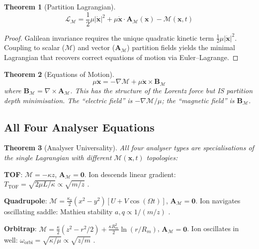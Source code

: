 \documentclass[11pt,twocolumn,a4paper]{article}
\newtheorem{theorem}{Theorem}[section]
\theoremstyle{definition}
\theoremstyle{remark}
\newcommand{\Depth}{\mathcal{M}}
\newcommand{\partinert}{\mu}
\newcommand{\Apartition}{\mathbf{A}_{\mathcal{M}}}
\newcommand{\Lagr}{\mathcal{L}}
\begin{document}
\begin{theorem}[Partition Lagrangian]
\label{thm:lagrangian}
\begin{equation}
\boxed{\Lagr_\Depth = \frac{1}{2}\partinert|\dot{\mathbf{x}}|^2 + \partinert\dot{\mathbf{x}}\cdot\Apartition(\mathbf{x}) - \Depth(\mathbf{x}, t)}
\end{equation}
\end{theorem}

\begin{proof}
Galilean invariance requires the unique quadratic kinetic term $\frac{1}{2}\partinert|\dot{\mathbf{x}}|^2$. Coupling to scalar ($\Depth$) and vector ($\Apartition$) partition fields yields the minimal Lagrangian that recovers correct equations of motion via Euler--Lagrange.
\end{proof}

\begin{theorem}[Equations of Motion]
\begin{equation}
\boxed{\partinert\ddot{\mathbf{x}} = -\nabla\Depth + \partinert\dot{\mathbf{x}} \times \mathbf{B}_\Depth}
\end{equation}
where $\mathbf{B}_\Depth = \nabla \times \Apartition$. This has the \emph{structure} of the Lorentz force but IS partition depth minimisation. The ``electric field'' is $-\nabla\Depth/\partinert$; the ``magnetic field'' is $\mathbf{B}_\Depth$.
\end{theorem}

\subsection{All Four Analyser Equations}

\begin{theorem}[Analyser Universality]
\label{thm:analyzers}
All four analyser types are specialisations of the single Lagrangian with different $\Depth(\mathbf{x},t)$ topologies:
\end{theorem}

\textbf{TOF}: $\Depth = -\kappa z$, $\Apartition = \mathbf{0}$. Ion descends linear gradient: $T_{\mathrm{TOF}} = \sqrt{2\partinert L/\kappa} \propto \sqrt{m/z}$ \citep{wiley1955}.

\textbf{Quadrupole}: $\Depth = \frac{\kappa_0}{2}(x^2-y^2)[U + V\cos(\Omega t)]$, $\Apartition = \mathbf{0}$. Ion navigates oscillating saddle: Mathieu stability $a,q \propto 1/(m/z)$ \citep{paul1990, march2005}.

\textbf{Orbitrap}: $\Depth = \frac{\kappa}{2}(z^2 - r^2/2) + \frac{\kappa R_m^2}{2}\ln(r/R_m)$, $\Apartition = \mathbf{0}$. Ion oscillates in well: $\omega_{\mathrm{orbi}} = \sqrt{\kappa/\partinert} \propto \sqrt{z/m}$ \citep{makarov2000}.
\end{document}
